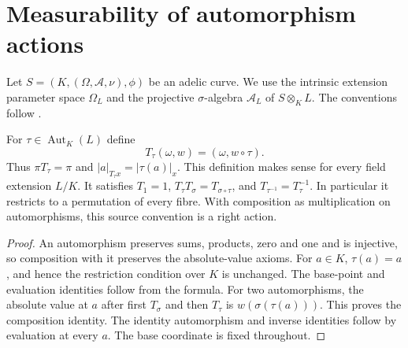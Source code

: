 \section{Measurability of automorphism actions}

Let $S=(K,(\Omega,\mathcal A,\nu),\phi)$ be an adelic curve.
We use the intrinsic extension parameter space $\Omega_L$ and the
projective $\sigma$-algebra $\mathcal A_L$ of $S\otimes_K L$.
The conventions follow \cite[Section 3.6]{chen-moriwaki}.

\begin{definition}
\label{def:automorphism-pullback}
\leanok
For $\tau\in\operatorname{Aut}_K(L)$ define
\[
 T_\tau(\omega,w)=(\omega,w\circ\tau).
\]
Thus $\pi T_\tau=\pi$ and $|a|_{T_\tau x}=|\tau(a)|_x$.
This definition makes sense for every field extension $L/K$.
It satisfies $T_1=1$, $T_\tau T_\sigma=T_{\sigma\circ\tau}$,
and $T_{\tau^{-1}}=T_\tau^{-1}$. In particular it restricts to a
permutation of every fibre. With composition as multiplication on
automorphisms, this source convention is a right action.
\end{definition}
\begin{proof}
An automorphism preserves sums, products, zero and one and is injective,
so composition with it preserves the absolute-value axioms. For $a\in K$,
$\tau(a)=a$, and hence the restriction condition over $K$ is unchanged.
The base-point and evaluation identities follow from the formula.
For two automorphisms, the absolute value at $a$ after first $T_\sigma$
and then $T_\tau$ is $w(\sigma(\tau(a)))$. This proves the composition
identity. The identity automorphism and inverse identities follow by
evaluation at every $a$. The base coordinate is fixed throughout.
\end{proof}

